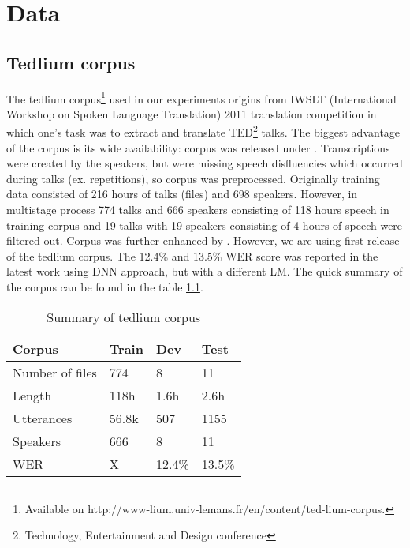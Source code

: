\chapter{Data}
\section{Tedlium corpus}


The tedlium corpus\footnote{Available on http://www-lium.univ-lemans.fr/en/content/ted-lium-corpus. } used in our experiments origins from IWSLT (International Workshop on Spoken Language Translation) 2011 translation competition in which one's task was to extract and translate TED\footnote{Technology, Entertainment and Design conference} talks. The biggest advantage of the corpus is its wide availability: corpus was released \parencite{rousseau_ted-lium:_2012} under \textcite{_creative_????}. Transcriptions were created by the speakers, but were missing speech disfluencies which occurred during talks (ex. repetitions), so corpus was preprocessed. Originally training data consisted of 216 hours of talks (files) and 698 speakers. However, in multistage process 774 talks and 666 speakers consisting of 118 hours speech in training corpus and 19 talks with 19 speakers consisting of 4 hours of speech were filtered out. Corpus was further enhanced by \textcite{rousseau_enhancing_2014}. However, we are using first release of the tedlium corpus. The 12.4\% and 13.5\% WER score was reported in the latest work using DNN approach, but with a different LM. The quick summary of the corpus can be found in the table \ref{tedlium_corpus_table}.  

\begin{table}[h!]
\centering
\begin{tabular}{ llll } 
\toprule
 Corpus & Train & Dev & Test \\ 
\midrule
 Number of files & 774 & 8 & 11 \\ 
 Length & 118h & 1.6h  & 2.6h  \\ 
 Utterances & 56.8k & 507 & 1155 \\ 
 Speakers & 666 & 8 & 11 \\ 
 WER & X & 12.4\% & 13.5\% \\ 
 \bottomrule
\end{tabular} 
\caption{Summary of tedlium corpus}
\label{tedlium_corpus_table}
\end{table}

\begin{comment}
\section{Language model}
Recurrent: \cite{williams_scaling_2015}

\end{comment}

